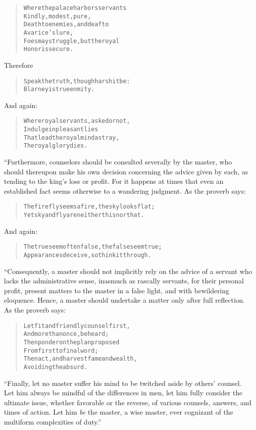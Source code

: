 \documentclass[article, twoside, 10pt]{memoir}
\renewenvironment{verbatim}{%
\begin{quote}%
\vskip -10pt%
\begin{alltt}\normalfont\small}{\end{alltt}%
\end{quote}%
\vskip -10pt
} %
\begin{document}
\begin{verbatim}
Where the palace harbors servants
    Kindly, modest, pure,
Death to enemies, and deaf to
    Avarice's lure,
Foes may struggle, but the royal
    Honor is secure.
\end{verbatim}
Therefore

\begin{verbatim}
Speak the truth, though harsh it be:
Blarney is true enmity.
\end{verbatim}
And again:

\begin{verbatim}
Where royal servants, asked or not,
    Indulge in pleasant lies
That lead the royal mind astray,
    The royal glory dies.
\end{verbatim}
“Furthermore, counselors should be consulted severally by the
master, who should thereupon make his own decision concerning the
advice given by each, as tending to the king's loss or profit. For
it happens at times that even an established fact seems otherwise
to a wandering judgment. As the proverb says:

\begin{verbatim}
The firefly seems a fire, the sky looks flat;
Yet sky and fly are neither this nor that.
\end{verbatim}
And again:

\begin{verbatim}
The true seem often false, the false seem true;
Appearances deceive, so think it through.
\end{verbatim}
“Consequently, a master should not implicitly rely on the advice of
a servant who lacks the administrative sense, inasmuch as rascally
servants, for their personal profit, present matters to the master
in a false light, and with bewildering eloquence. Hence, a master
should undertake a matter only after full reflection. As the
proverb says:

\begin{verbatim}
Let fit and friendly counsel first,
    And more than once, be heard;
Then ponder on the plan proposed
    From first to final word;
Then act, and harvest fame and wealth,
    Avoiding the absurd.
\end{verbatim}
``Finally, let no master suffer his mind to be twitched aside by others' counsel. Let him always be mindful of the differences in men, let him fully consider the ultimate issue, whether favorable or the reverse, of various counsels, answers, and times of action. Let him \emph{be} the master, a wise master, ever cognizant of the multiform complexities of duty.''
\end{document}
